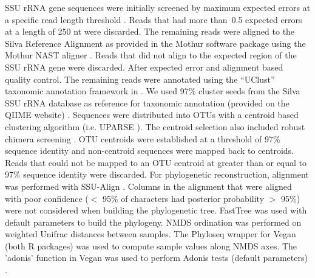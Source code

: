 SSU rRNA gene sequences were initially screened by maximum expected errors at
a specific read length threshold  \citep{edgar2013}. Reads that had more
than~0.5 expected errors at a length of 250 nt were discarded. The remaining
reads were aligned to the Silva Reference Alignment as provided in the Mothur
software package using the Mothur NAST aligner
\citep{DeSantis2005,schloss2009}. Reads that did not align to the expected
region of the SSU rRNA gene were discarded. After expected error and alignment
based quality control. The remaining reads
were annotated using the “UClust” taxonomic annotation framework in
\citep{caporaso2010,edgar2010}. We used 97\% cluster seeds from the Silva SSU
rRNA database \citep{quast2013} as reference for taxonomic annotation
(provided on the QIIME website) \citep{quast2013}. Sequences were
distributed into OTUs with a centroid based clustering algorithm (i.e.
UPARSE \citep{edgar2013}). The centroid selection also included robust
chimera screening \citep{edgar2013}. OTU centroids were established at
a threshold of 97\% sequence identity and non-centroid sequences were
mapped back to centroids. Reads that could not be mapped to an OTU
centroid at greater than or equal to 97\% sequence identity were
discarded. For phylogenetic reconstruction, alignment was performed with
SSU-Align \citep{nawrocki2009,nawrocki2013}. Columns in the alignment that
were aligned with poor confidence ($<$ 95\% of characters had posterior
probability $>$ 95\%) were not considered when building the phylogenetic
tree. FastTree \citep{price2010} was used with default parameters to build
the phylogeny. NMDS ordination was performed on weighted Unifrac
\citep{lozupone2005} distances between samples. The Phyloseq
\citep{mcmurdie2013} wrapper for Vegan \citep{oksanen2015} (both
R packages) was used to compute sample values along NMDS axes. The
'adonis' function in Vegan was used to perform Adonis tests (default
parameters) \citep{Anderson2001a}.

